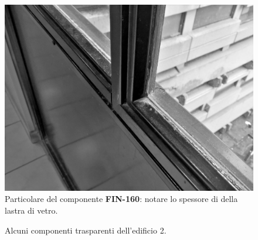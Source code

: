 \begin{figure}[t]
	\centering
	\includegraphics[width=\textwidth]{6_2_cap/img/fin1}
	\caption[Particolare del componente FIN-160]{Particolare del componente \textbf{FIN-160}: notare lo spessore di  della lastra di vetro.}\label{fin1}
\end{figure}

\begin{figure}[t]
	\centering
	 \quad
	\caption{Alcuni componenti trasparenti dell'edificio 2.}
\end{figure}

